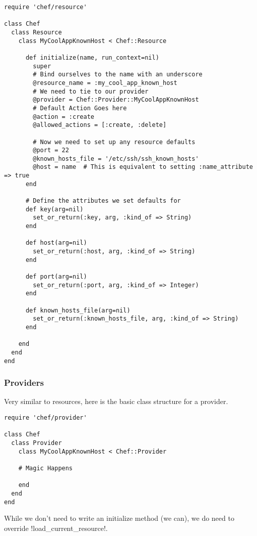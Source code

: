 \begin{lstlisting}[label=lst:cookbook-hwrp4]
require 'chef/resource'

class Chef
  class Resource
    class MyCoolAppKnownHost < Chef::Resource

      def initialize(name, run_context=nil)
        super
        # Bind ourselves to the name with an underscore
        @resource_name = :my_cool_app_known_host
        # We need to tie to our provider
        @provider = Chef::Provider::MyCoolAppKnownHost
        # Default Action Goes here
        @action = :create
        @allowed_actions = [:create, :delete]

        # Now we need to set up any resource defaults
        @port = 22
        @known_hosts_file = '/etc/ssh/ssh_known_hosts'
        @host = name  # This is equivalent to setting :name_attribute => true
      end

      # Define the attributes we set defaults for
      def key(arg=nil)
        set_or_return(:key, arg, :kind_of => String)
      end

      def host(arg=nil)
        set_or_return(:host, arg, :kind_of => String)
      end

      def port(arg=nil)
        set_or_return(:port, arg, :kind_of => Integer)
      end

      def known_hosts_file(arg=nil)
        set_or_return(:known_hosts_file, arg, :kind_of => String)
      end

    end
  end
end
\end{lstlisting}

\subsubsection{Providers}

Very similar to resources, here is the basic class structure for a provider.

\begin{lstlisting}[label=lst:cookbook-hwrp5]
require 'chef/provider'

class Chef
  class Provider
    class MyCoolAppKnownHost < Chef::Provider

    # Magic Happens

    end
  end
end
\end{lstlisting}

While we don't need to write an initialize method (we can), we do need to override \inline!load_current_resource!.

